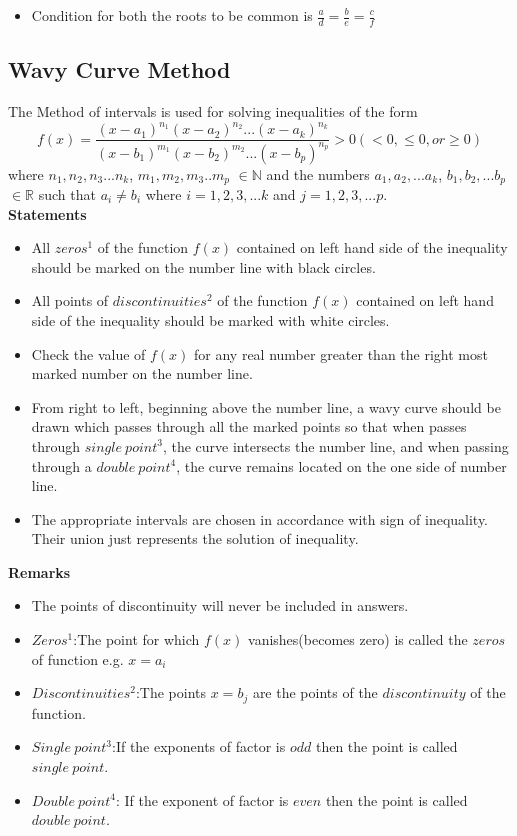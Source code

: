 \documentclass[twocolumn, 10pt]{article}
\begin{document}
\begin{itemize}
\item Condition for both the roots to be common is $\frac{a}{d}=\frac{b}{e}=\frac{c}{f}$
\end{itemize}
\subsection{Wavy Curve Method}
The Method of intervals is used for solving inequalities of the form 
$$f(x)= \frac{(x-a_1)^{n_1}(x-a_2)^{n_2}...(x-a_k)^{n_k}}{(x-b_1)^{m_1}(x-b_2)^{m_2}...(x-b_p)^{n_p}} >0(<0, \le 0, or \ge 0 )$$
where $n_1,n_2,n_3...n_k$, $m_1,m_2,m_3..m_p$ $\in \mathbb{N}$ and the numbers $a_1,a_2,...a_k$, $b_1,b_2,...b_p$ $\in \mathbb{R}$ such that
$a_i \not= b_i$ where $i=1,2,3,...k$ and $j=1,2,3,...p$.\\
\textbf{Statements}
\begin{itemize}
\item All $zeros^1$ of the function $f(x)$ contained on left hand side of the inequality should be marked on the number line with black circles.
\item All points of $discontinuities^2$ of the function $f(x)$ contained on left hand side of the inequality should be marked with white circles.
\item Check the value of $f(x)$ for any real number greater than the right most marked number on the number line. 
\item From right to left, beginning above the number line, a wavy curve should be drawn which passes through all the marked points so that when passes through $single \medspace point^3$, the curve intersects the number line, and when passing through a $double \medspace point^4$, the curve remains located on the one side of number line.
\item The appropriate intervals are chosen in accordance with sign of inequality. Their union just represents the solution of inequality.
\end{itemize}
\textbf{Remarks}
\begin{itemize}
\item The points of discontinuity will never be included in answers.
\item $Zeros^1$:The point for which $f(x)$ vanishes(becomes zero) is called the $zeros$ of function e.g. $x=a_i$
\item $Discontinuities^2$:The points $x=b_j$ are the points of the $discontinuity$ of the function.
\item $Single \medspace point^3$:If the exponents of factor is $odd$ then the point is called $single \medspace point$.
\item $Double \medspace point^4$: If the exponent of factor is $even$ then the point is called $double \medspace point$.
\end{itemize}
\end{document}
